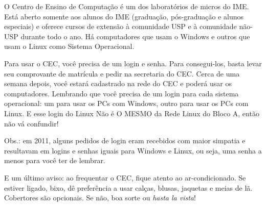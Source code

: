 \documentclass[11pt]{report}
\newenvironment{secao}[1] {
    \framebox[\textwidth] {
        \rule[-1.2ex]{5ex}{5.5ex}
        {\Large\sf #1}
        \hspace{\stretch{1}}
    } \addcontentsline{toc}{chapter}{#1}
    \nopagebreak[4]
} { 
}
\begin{document}

\begin{secao}{CEC}

O Centro de Ensino de Computação é um dos laboratórios de micros do IME. Está aberto somente aos alunos do IME (graduação, pós-graduação e alunos especiais) e oferece cursos de extensão à comunidade USP e à comunidade não-USP durante todo o ano. Há computadores que usam o Windows e outros que usam o Linux como Sistema Operacional.

Para usar o CEC, você precisa de um login e senha. Para consegui-los, basta levar seu comprovante de matrícula e pedir na secretaria do CEC. Cerca de uma semana depois, você estará cadastrado na rede do CEC e poderá usar os computadores. Lembrando que você precisa de um login para cada sistema operacional: um para usar os PCs com Windows, outro para usar os PCs com Linux. E esse login do Linux Não é O MESMO da Rede Linux do Bloco A, então não vá confundir!

Obs.: em 2011, alguns pedidos de login eram recebidos com maior simpatia e resultavam em logins e senhas iguais para Windows e Linux, ou seja, uma senha a menos para você ter de lembrar. 

E um último aviso: ao frequentar o CEC, fique atento ao ar-condicionado. Se estiver ligado, bixo, dê preferência a usar calças, blusas, jaquetas e meias de lã. Cobertores são opcionais. Se não, boa sorte ou \textit{hasta la vista}! 

\end{secao}
\end{document}
